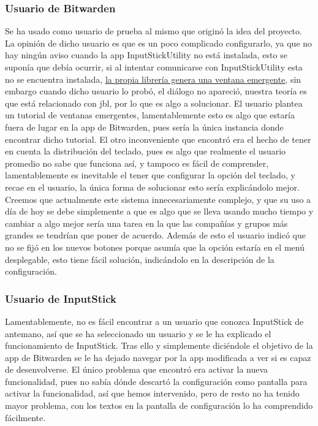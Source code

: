 \subsubsection{Usuario de Bitwarden}
Se ha usado como usuario de prueba al mismo que originó la idea del proyecto. La opinión de dicho usuario es que es un poco complicado configurarlo, ya que no hay ningún aviso cuando la app InputStickUtility no está instalada, esto se suponía que debía ocurrir, si al intentar comunicarse con InputStickUtility esta no se encuentra instalada, \href{https://github.com/inputstick/InputStickAPI-Android/blob/81d9ce96aa9e4db4f508090f54bea981ffecfcb7/InputStickAPI/src/com/inputstick/api/broadcast/InputStickBroadcast.java\#L73}{la propia librería genera una ventana emergente}, sin embargo cuando dicho usuario lo probó, el diálogo no apareció, nuestra teoría es que está relacionado con \gls{jbl}, por lo que es algo a solucionar. El usuario plantea un tutorial de ventanas emergentes, lamentablemente esto es algo que estaría fuera de lugar en la app de Bitwarden, pues sería la única instancia donde encontrar dicho tutorial. El otro inconveniente que encontró era el hecho de tener en cuenta la distribución del teclado, pues es algo que realmente el usuario promedio no sabe que funciona así, y tampoco es fácil de comprender, lamentablemente es inevitable el tener que configurar la opción del teclado, y recae en el usuario, la única forma de solucionar esto sería explicándolo mejor. Creemos que actualmente este sistema innecesariamente complejo, y que su uso a día de hoy se debe simplemente a que es algo que se lleva usando mucho tiempo y cambiar a algo mejor sería una tarea en la que las compañías y grupos más grandes se tendrían que poner de acuerdo. Además de esto el usuario indicó que no se fijó en los nuevos botones porque asumía que la opción estaría en el menú desplegable, esto tiene fácil solución, indicándolo en la descripción de la configuración.

\subsubsection{Usuario de InputStick}
Lamentablemente, no es fácil encontrar a un usuario que conozca InputStick de antemano, así que se ha seleccionado un usuario y se le ha explicado el funcionamiento de InputStick. Tras ello y simplemente diciéndole el objetivo de la app de Bitwarden se le ha dejado navegar por la app modificada a ver si es capaz de desenvolverse. El único problema que encontró era activar la nueva funcionalidad, pues no sabía dónde descartó la configuración como pantalla para activar la funcionalidad, así que hemos intervenido, pero de resto no ha tenido mayor problema, con los textos en la pantalla de configuración lo ha comprendido fácilmente.